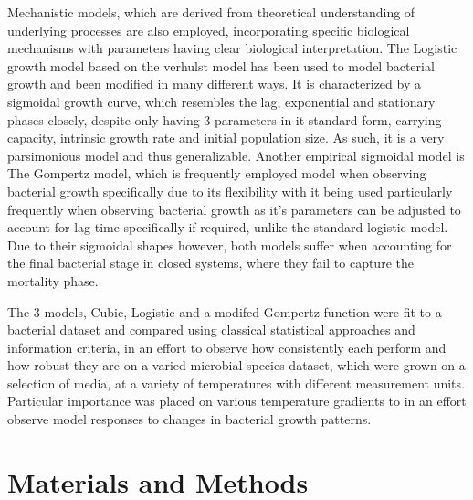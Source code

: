 \documentclass[11pt]{article}
\begin{document}
Mechanistic models, which are derived from theoretical understanding of underlying processes are also employed, incorporating specific biological mechanisms with parameters having clear biological interpretation. The Logistic growth model based on the verhulst model has been used to model bacterial growth and been modified in many different ways\cite{Peleg01122011}. It is characterized by a sigmoidal growth curve, which resembles the lag, exponential and stationary phases closely, despite only having 3 parameters in it standard form, carrying capacity, intrinsic growth rate and initial population size. As such, it is a very parsimonious model and thus generalizable. Another empirical sigmoidal model is The Gompertz model, which is frequently employed model when observing bacterial growth specifically due to its flexibility with it being used particularly frequently when observing bacterial growth as it's parameters can be adjusted to account for lag time specifically if required, unlike the standard logistic model. Due to their sigmoidal shapes however, both models suffer when accounting for the final bacterial stage in closed systems, where they fail to capture the mortality phase\cite{buchanan1997simple, Peleg01122011}.  

The 3 models, Cubic, Logistic and a modifed Gompertz function were fit to a bacterial dataset and compared using classical statistical approaches and information criteria, in an effort to observe how consistently each perform and how robust they are on a varied microbial species dataset, which were grown on a selection of media, at a variety of temperatures with different measurement units. Particular importance was placed on various temperature gradients to in an effort observe model responses to changes in bacterial growth patterns.    

\setlength{\parskip}{1.2em} %


\section{Materials and Methods}
\end{document}

